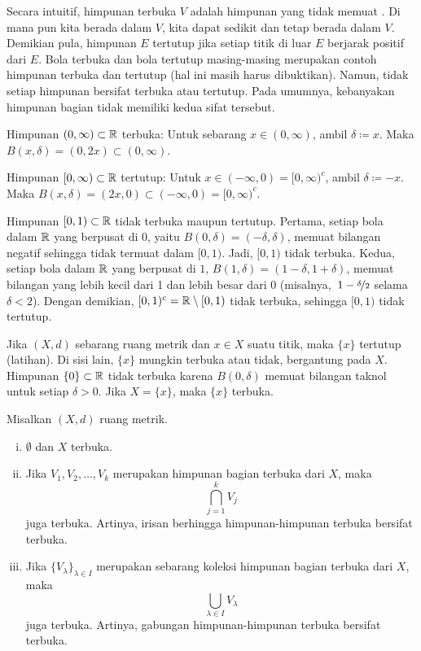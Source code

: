 Secara intuitif, himpunan terbuka $V$ adalah himpunan yang tidak memuat
.
Di mana pun kita berada dalam $V$,
kita dapat  sedikit dan
tetap berada dalam $V$.  Demikian pula, himpunan $E$ tertutup jika setiap titik di luar $E$
berjarak positif dari $E$.
Bola terbuka dan bola tertutup masing-masing merupakan contoh himpunan terbuka dan tertutup
(hal ini masih harus dibuktikan).
Namun, tidak setiap himpunan bersifat terbuka atau tertutup.  Pada umumnya, kebanyakan himpunan bagian tidak memiliki kedua sifat tersebut.

\begin{example}
Himpunan $(0,\infty) \subset {\mathbb{R}}$ terbuka:  Untuk sebarang $x \in (0,\infty)$,
ambil $\delta \coloneqq x$.  Maka $B(x,\delta) = (0,2x) \subset (0,\infty)$.

Himpunan $[0,\infty) \subset {\mathbb{R}}$ tertutup:  Untuk $x \in (-\infty,0) =
[0,\infty)^c$,
ambil $\delta \coloneqq -x$.  Maka $B(x,\delta) = (2x,0) \subset
(-\infty,0) = [0,\infty)^c$.

Himpunan $[0,1) \subset {\mathbb{R}}$ tidak terbuka maupun tertutup.  Pertama,
setiap bola dalam ${\mathbb{R}}$ yang berpusat di $0$, yaitu $B(0,\delta) = (-\delta,\delta)$, memuat bilangan
negatif sehingga tidak termuat dalam $[0,1)$.  Jadi, $[0,1)$ tidak terbuka.
Kedua, setiap bola dalam ${\mathbb{R}}$ yang berpusat di $1$,
$B(1,\delta) = (1-\delta,1+\delta)$, memuat
bilangan yang lebih kecil dari 1 dan lebih besar dari 0
(misalnya,\ $1-\nicefrac{\delta}{2}$ selama $\delta < 2$).
Dengan demikian, $[0,1)^c = {\mathbb{R}} \setminus
[0,1)$ tidak terbuka, sehingga $[0,1)$ tidak tertutup.

Jika $(X,d)$ sebarang ruang metrik dan $x \in X$ suatu titik, maka $\{ x \}$
tertutup (latihan).
Di sisi lain, $\{ x \}$ mungkin terbuka atau tidak, bergantung pada $X$.
Himpunan $\{ 0 \} \subset {\mathbb{R}}$ tidak terbuka karena $B(0,\delta)$
memuat bilangan taknol untuk setiap $\delta > 0$.
Jika $X=\{ x \}$, maka $\{ x \}$ terbuka.
\end{example}

\begin{prop} \label{prop:topology:open}
Misalkan $(X,d)$ ruang metrik.
\begin{enumerate}[(i)]
\item \label{topology:openi} $\emptyset$ dan $X$ terbuka.
\item \label{topology:openii} Jika $V_1, V_2, \ldots, V_k$ merupakan himpunan bagian terbuka dari $X$, maka
\begin{equation*}
\bigcap_{j=1}^k V_j
\end{equation*}
juga terbuka.  Artinya, irisan berhingga himpunan-himpunan terbuka bersifat terbuka.
\item \label{topology:openiii} Jika $\{ V_\lambda \}_{\lambda \in I}$ merupakan
sebarang koleksi himpunan bagian terbuka dari $X$, maka
\begin{equation*}
\bigcup_{\lambda \in I} V_\lambda
\end{equation*}
juga terbuka.  Artinya, gabungan himpunan-himpunan terbuka bersifat terbuka.
\end{enumerate}
\end{prop}

